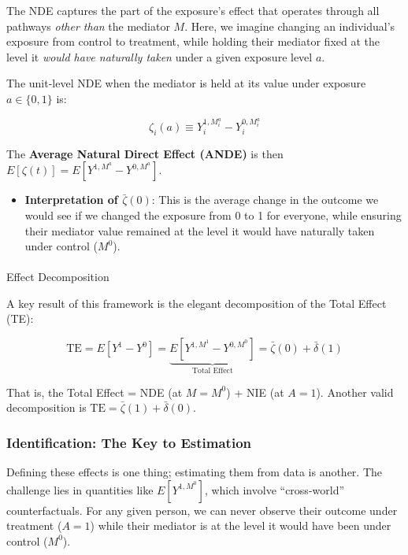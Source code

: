 \documentclass[
  10pt,
  letterpaper,
  DIV=11,
  numbers=noendperiod,
  oneside]{scrartcl}
\makeatletter
\let\oldparagraph\paragraph
\renewcommand{\paragraph}{
    \@ifstar
      \xxxParagraphStar
      \xxxParagraphNoStar
  }
\newcommand{\xxxParagraphStar}[1]{\oldparagraph*{#1}\mbox{}}
\newcommand{\xxxParagraphNoStar}[1]{\oldparagraph{#1}\mbox{}}
\providecommand{\tightlist}{%
  \setlength{\itemsep}{0pt}\setlength{\parskip}{0pt}}
\makeatother
\begin{document}
The NDE captures the part of the exposure's effect that operates through
all pathways \emph{other than} the mediator \(M\). Here, we imagine
changing an individual's exposure from control to treatment, while
holding their mediator fixed at the level it \emph{would have naturally
taken} under a given exposure level \(a\).

The unit-level NDE when the mediator is held at its value under exposure
\(a \in \{0,1\}\) is:

\[
\zeta_i(a) \equiv Y_i^{1, M_i^a} - Y_i^{0, M_i^a} 
\]

The \textbf{Average Natural Direct Effect (ANDE)} is then
\(E[\zeta(t)] = E[Y^{1, M^a} - Y^{0, M^a}]\).

\begin{itemize}
\tightlist
\item
  \textbf{Interpretation of \(\bar{\zeta}(0)\)}: This is the average
  change in the outcome we would see if we changed the exposure from 0
  to 1 for everyone, while ensuring their mediator value remained at the
  level it would have naturally taken under control (\(M^0\)).
\end{itemize}

\paragraph{Effect Decomposition}\label{effect-decomposition}

A key result of this framework is the elegant decomposition of the Total
Effect (TE):

\[
\text{TE} = E[Y^1 - Y^0] = \underbrace{E[Y^{1, M^1} - Y^{0, M^0}]}_{\text{Total Effect}} = \bar{\zeta}(0) + \bar{\delta}(1) 
\]

That is, the Total Effect = NDE (at \(M=M^0\)) + NIE (at \(A=1\)).
Another valid decomposition is
\(\text{TE} = \bar{\zeta}(1) + \bar{\delta}(0)\).

\subsubsection{Identification: The Key to
Estimation}\label{identification-the-key-to-estimation}

Defining these effects is one thing; estimating them from data is
another. The challenge lies in quantities like \(E[Y^{1, M^0}]\), which
involve ``cross-world'' counterfactuals. For any given person, we can
never observe their outcome under treatment (\(A=1\)) while their
mediator is at the level it would have been under control (\(M^0\)).
\end{document}
